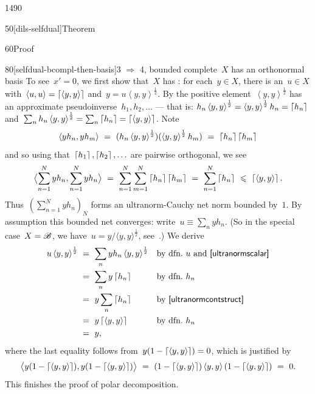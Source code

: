 \begin{parsec}{1490}
\begin{point}{50}[dils-selfdual]{Theorem}
\begin{point}{60}{Proof}
\begin{point}{80}[selfdual-bcompl-then-basis]{3
    $\Rightarrow$ 4, bounded complete~$X$ has an orthonormal basis}
To see~$x'=0$, we
first show that~$X$ has :
    for each~$y \in X$, there is an~$u\in X$
    with~$\left<u,u\right> = \left\lceil\left<y,y\right>\right\rceil$
        and~$y=u\left<y,y\right>^{\frac{1}{2}}$.
By 
    the positive element~$\left<y,y\right>^{\frac{1}{2}}$
    has an approximate pseudoinverse~$h_1, h_2, \ldots$
    --- that is:
    $h_n \left<y,y\right>^{\frac{1}{2}} =
         \left<y,y\right>^{\frac{1}{2}} h_n
         = \left\lceil h_n\right\rceil$
         and~$\sum_n h_n \left<y,y\right>^{\frac{1}{2}} = \sum_n \left\lceil h_n\right\rceil
                    = \left\lceil\left<y,y\right>\right\rceil$. Note
\begin{equation*}
    \left<yh_n,yh_m\right> \ = \ 
        (h_n \left<y,y\right>^{\frac{1}{2}})
        (\left<y,y\right>^{\frac{1}{2}} h_m) \ =\  \ceil{h_n}\ceil{h_m}
\end{equation*}
and so using that~$\left\lceil h_1\right\rceil, \left\lceil h_2\right\rceil, \ldots$ are pairwise orthogonal,
    we see
\begin{equation*}
    \bigl< \sum_{n=1}^N y h_n, \sum_{n=1}^N y h_n \bigr> 
    \ =\  \sum_{n=1}^N \sum_{m=1}^N \left\lceil h_n\right\rceil \left\lceil h_m\right\rceil
                \ =\  \sum_{n=1}^N \left\lceil h_n\right\rceil
                \ \leqslant\  \left\lceil\left<y,y\right>\right\rceil.
\end{equation*}
Thus~$( \sum_{n=1}^N y h_n)_N$ forms an ultranorm-Cauchy net
    norm bounded by~$1$.
By assumption this bounded net converges:
    write~$u \equiv \sum_n yh_n$.
(So in the special case~$X = \mathscr{B}$,
    we have~$u = y / \langle y,y \rangle^{\frac{1}{2}}$,
    see~.)
We derive
\begin{align*}
u \left<y,y\right>^{\frac{1}{2}}
&\ =\  \sum_n yh_n \left<y,y\right>^{\frac{1}{2}} 
    && \text{by dfn.~$u$ and \sref{ultranormscalar}}
\\
&\ =\  \sum_n y \ceil{h_n} 
    && \text{by dfn.~$h_n$}\\
    &\ =\  y \sum_n\ceil{h_n}
&& \text{by \sref{ultranormcontstruct}} \\
&\ =\  y \ceil{\left<y,y\right>} && \text{by dfn.~$h_n$}\\
&\ =\  y,
\end{align*}
where the last equality 
follows from~$y (1- \left\lceil\left<y,y\right>\right\rceil)=0$,
    which is justified by
\begin{equation*}
    \bigl<
        y (1- \ceil{\left<y,y\right>}),
        y (1- \ceil{\left<y,y\right>}) \bigr>
        \ = \ 
        (1- \ceil{\left<y,y\right>}) \left<y,y\right>
        (1- \ceil{\left<y,y\right>})
        \ = \  0.
\end{equation*}
This finishes the proof of polar decomposition.


\end{point}
\end{point}
\end{point}
\end{parsec}
